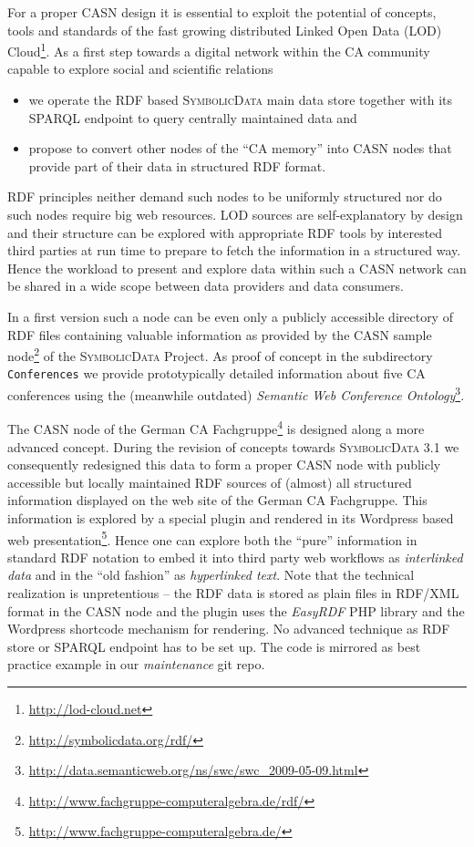 \documentclass{mathincs}
\newcommand{\SD}{\textsc{Symbo\-lic\-Data}}
\begin{document}
For a proper CASN design it is essential to exploit the potential of concepts,
tools and standards of the fast growing distributed Linked Open Data (LOD)
Cloud\footnote{ \url{http://lod-cloud.net}}.  As a first step towards a digital
network within the CA community capable to explore social and scientific
relations
\begin{itemize}
\item we operate the RDF based {\SD} main data store together with its SPARQL
  endpoint \cite{sdsparql} to query centrally maintained data and
\item propose to convert other nodes of the ``CA memory'' into CASN nodes that
  provide part of their data in structured RDF format.
\end{itemize}
RDF principles neither demand such nodes to be uniformly structured nor do such
nodes require big web resources. LOD sources are self-explanatory by design and
their structure can be explored with appropriate RDF tools by interested third
parties at run time to prepare to fetch the information in a structured way.
Hence the workload to present and explore data within such a CASN network can be
shared in a wide scope between data providers and data consumers.

In a first version such a node can be even only a publicly accessible directory
of RDF files containing valuable information as provided by the CASN sample
node\footnote{ \url{http://symbolicdata.org/rdf/}} of the {\SD} Project. As
proof of concept in the subdirectory \texttt{Conferences} we provide
prototypically detailed information about five CA conferences using the
(meanwhile outdated) \emph{Semantic Web Conference Ontology}\footnote{
  \url{http://data.semanticweb.org/ns/swc/swc_2009-05-09.html}}.

The CASN node of the German CA Fachgruppe\footnote{
  \url{http://www.fachgruppe-computeralgebra.de/rdf/}} is designed along a
more advanced concept. During the revision of concepts towards {\SD} 3.1 we
consequently redesigned this data to form a proper CASN node with publicly
accessible but locally maintained RDF sources of (almost) all structured
information displayed on the web site of the German CA Fachgruppe.  This
information is explored by a special plugin and rendered in its Wordpress
based web presentation\footnote{
  \url{http://www.fachgruppe-computeralgebra.de/}}.  Hence one can explore
both the ``pure'' information in standard RDF notation to embed it into third
party web workflows as \emph{interlinked data} and in the ``old fashion'' as
\emph{hyperlinked text}.  Note that the technical realization is unpretentious
-- the RDF data is stored as plain files in RDF/XML format in the CASN node
and the plugin uses the \emph{EasyRDF} PHP library and the Wordpress shortcode
mechanism for rendering.  No advanced technique as RDF store or SPARQL
endpoint has to be set up.  The code is mirrored as best practice example in
our \emph{maintenance} git repo.
\end{document}
